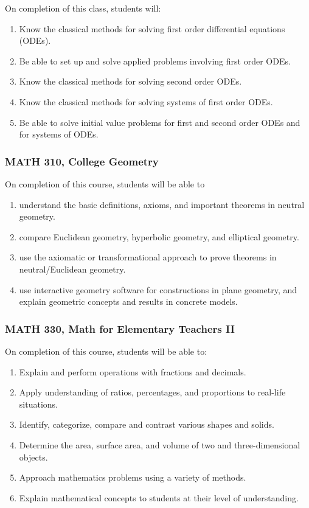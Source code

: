 \documentclass[11pt]{article}
\newenvironment{alphalist}{
\begin{enumerate}[label=(\arabic*),widest=107 ,leftmargin=25pt, itemsep=0pt]}
{\end{enumerate}}
\begin{document}
On completion of this class, students will: 
\begin{alphalist}
    \item Know the classical methods for solving first order differential equations (ODEs).
    \item Be able to set up and solve applied problems involving first order ODEs.
    \item Know the classical methods for solving second order ODEs.
    \item Know the classical methods for solving systems of first order ODEs.
    \item Be able to solve initial value problems for first and second order ODEs and for systems of ODEs.
\end{alphalist}

\subsubsection*{MATH 310, College Geometry}

On completion of this course, students will be able to
\begin{alphalist}
    \item understand the basic definitions, axioms, and important theorems in neutral geometry.
    \item compare Euclidean geometry, hyperbolic geometry, and elliptical geometry.
    \item use the axiomatic or transformational approach to prove theorems in neutral/Euclidean geometry.
    \item use interactive geometry software for constructions in plane geometry, and
    explain geometric concepts and results in concrete models.
\end{alphalist}

\subsubsection*{MATH 330, Math for Elementary Teachers II}

On completion of this course, students will be able to: 
\begin{alphalist}
\item Explain and perform operations with fractions and decimals. 
\item Apply understanding of ratios, percentages, and proportions to real-life situations. 
\item Identify, categorize, compare and contrast various shapes and solids. 
\item Determine the area, surface area, and volume of two and three-dimensional objects. 
\item Approach mathematics problems using a variety of methods. 
\item Explain mathematical concepts to students at their level of understanding.
\end{alphalist}
\end{document}
